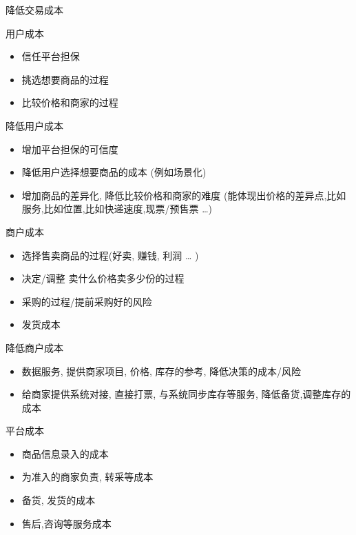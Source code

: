 \documentclass[presentation,bigger]{beamer}
\begin{document}
\begin{frame}{降低交易成本}
\framebreak


\begin{block}{用户成本}
\begin{itemize}
\item 信任平台担保
\item 挑选想要商品的过程
\item 比较价格和商家的过程
\end{itemize}
\end{block}

\framebreak


\begin{exampleblock}{降低用户成本}
\begin{itemize}
\item 增加平台担保的可信度
\item 降低用户选择想要商品的成本 (例如场景化)
\item 增加商品的差异化, 降低比较价格和商家的难度 (能体现出价格的差异点,比如服务,比如位置,比如快递速度,现票/预售票 \dots{})
\end{itemize}
\end{exampleblock}


\framebreak


\begin{block}{商户成本}
\begin{itemize}
\item 选择售卖商品的过程(好卖, 赚钱, 利润 \dots{} )
\item 决定/调整 卖什么价格卖多少份的过程
\item 采购的过程/提前采购好的风险
\item 发货成本
\end{itemize}
\end{block}

\framebreak

\begin{exampleblock}{降低商户成本}
\begin{itemize}
\item 数据服务, 提供商家项目, 价格, 库存的参考, 降低决策的成本/风险
\item 给商家提供系统对接, 直接打票, 与系统同步库存等服务, 降低备货,调整库存的成本
\end{itemize}
\end{exampleblock}


\framebreak



\begin{block}{平台成本}
\begin{itemize}
\item 商品信息录入的成本
\item 为准入的商家负责, 转采等成本
\item 备货, 发货的成本
\item 售后,咨询等服务成本
\end{itemize}
\end{block}


\end{frame}
\end{document}
